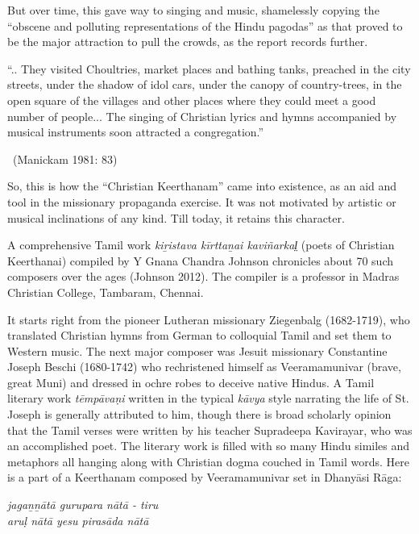 But over time, this gave way to singing and music, shamelessly copying the “obscene and polluting representations of the Hindu pagodas” as that proved to be the major attraction to pull the crowds, as the report records further.

\begin{myquote}
“.. They visited Choultries, market places and bathing tanks, preached in the city streets, under the shadow of idol cars, under the canopy of country-trees, in the open square of the villages and other places where they could meet a good number of people... The singing of Christian lyrics and hymns accompanied by musical instruments soon attracted a congregation.” 

~\hfill (Manickam 1981: 83)
\end{myquote}

So, this is how the “Christian Keerthanam” came into existence, as an aid and tool in the missionary propaganda exercise. It was not motivated by artistic or musical inclinations of any kind. Till today, it retains this character.

A comprehensive Tamil work \textit{kiṟistava kīrttaṉai kaviñarkal̤} (poets of Christian Keerthanai) compiled by Y Gnana Chandra Johnson chronicles about 70 such composers over the ages (Johnson 2012). The compiler is a professor in Madras Christian College, Tambaram, Chennai.

It starts right from the pioneer Lutheran missionary Ziegenbalg (1682-1719), who translated Christian hymns from German to colloquial Tamil and set them to Western music. The next major composer was Jesuit missionary Constantine Joseph Beschi (1680-1742) who rechristened himself as Veeramamunivar (brave, great Muni) and dressed in ochre robes to deceive native Hindus. A Tamil literary work \textit{tēmpāvaṇi }written in the typical \textit{kāvya} style narrating the life of St. Joseph is generally attributed to him, though there is broad scholarly opinion that the Tamil verses were written by his teacher Supradeepa Kavirayar, who was an accomplished poet. The literary work is filled with so many Hindu similes and metaphors all hanging along with Christian dogma couched in Tamil words. Here is a part of a Keerthanam composed by Veeramamunivar set in Dhanyāsi Rāga:

\begin{myquote}
\textit{jagaṉṉātā gurupara nātā - tiru \\ aruḷ nātā yesu pirasāda nātā }
\end{myquote}

